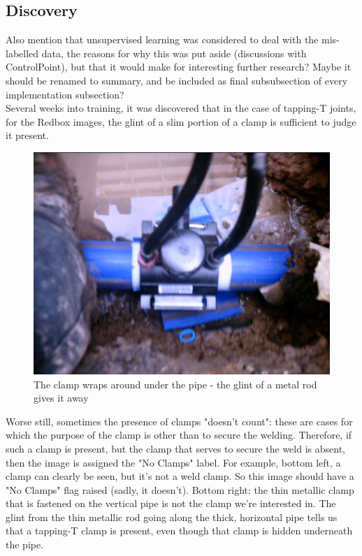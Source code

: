 \documentclass[a4paper,11pt]{article}
\begin{document}
\subsection{Discovery}

Also mention that unsupervised learning was considered to deal with the mis-labelled data, the reasons for why this was put aside (discussions with ControlPoint), but that it would make for interesting further research? Maybe it should be renamed to summary, and be included as final subsubsection of every implementation subsection? \\



Several weeks into training, it was discovered that in the case of tapping-T joints, for the Redbox images, the glint of a slim portion of a clamp is sufficient to judge it present. \\

\begin{figure}[h!]
	\centering
	\includegraphics[width=0.35\linewidth]{images/tapping-T.jpg}
	\caption{The clamp wraps around under the pipe - the glint of a metal rod gives it away}
\end{figure}

Worse still, sometimes the presence of clamps "doesn't count": these are cases for which the purpose of the clamp is other than to secure the welding. Therefore, if such a clamp is present, but the clamp that serves to secure the weld is absent, then the image is assigned the "No Clamps" label. For example, bottom left, a clamp can clearly be seen, but it's not a weld clamp. So this image should have a "No Clamps" flag raised (sadly, it doesn't). Bottom right: the thin metallic clamp that is fastened on the vertical pipe is not the clamp we're interested in. The glint from the thin metallic rod going along the thick, horizontal pipe tells us that a tapping-T clamp is present, even though that clamp is hidden underneath the pipe. 
\end{document}
